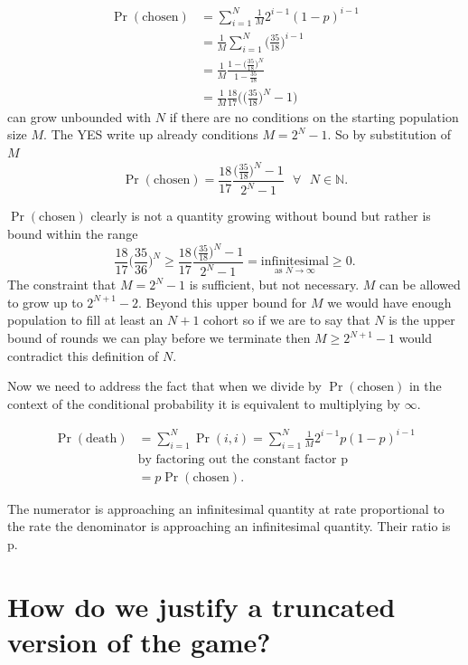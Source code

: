 \documentclass[article,twocolumn]{memoir}
\begin{document}
\begin{align*}
\Pr(\text{chosen}) &= \sum_{i=1}^{N} \tfrac{1}{M} 2^{i-1}(1-p)^{i-1}\\
&= \frac{1}{M} \sum_{i=1}^{N} \bigg(\frac{35}{18}\bigg)^{i-1}\\
&= \frac{1}{M} \frac{1-\bigg(\frac{35}{18}\bigg)^{N}}{1-\frac{35}{18}}\\
&= \frac{1}{M} \frac{18}{17}\bigg(\big(\frac{35}{18}\big)^N-1\bigg)
\end{align*}
can grow unbounded with $N$ if there are no conditions on the starting population size $M$.
The YES write up already conditions $M = 2^N-1$.
So by substitution of $M$
\begin{equation}\label{chosenALT}
\Pr(\text{chosen})= \frac{18}{17}\frac{\big(\frac{35}{18}\big)^N-1}{2^N-1} \text{  }\forall\text{  }N \in \mathbb{N}.
\end{equation}
        
$\Pr(\text{chosen})$ clearly is not a quantity growing without bound but rather is bound within the range 
$$\frac{18}{17}\bigg(\frac{35}{36}\bigg)^N\geq \frac{18}{17}\frac{\big(\frac{35}{18}\big)^N-1}{2^N-1}  = \underset{\text{as }N\to\infty }{\text{infinitesimal}} \geq 0.$$
The constraint that $M = 2^N-1$ is sufficient, but not necessary. 
$M$ can be allowed to grow up to $2^{N+1}-2$.
Beyond this upper bound for $M$ we would have enough population to fill at least an $N+1$ cohort so if we are to say that $N$ is the upper bound of rounds we can play before we terminate then $M\geq 2^{N+1}-1$ would contradict this definition of $N$.

Now we need to address the fact that when we divide by $\Pr(\text{chosen})$ in the context of the conditional probability it is equivalent to multiplying by $\infty$.

\begin{align*}
\Pr(\text{death})& = \sum_{i=1}^{N} \Pr(i,i)= \sum_{i=1}^{N} \tfrac{1}{M} 2^{i-1}p(1-p)^{i-1}\\
& \text{by factoring out the constant factor p} \\
& = p\Pr(\text{chosen}).
\end{align*}

The numerator is approaching an infinitesimal quantity at rate proportional to the rate the denominator is approaching an infinitesimal quantity.
Their ratio is p.

\chapter{How do we justify a truncated version of the game?}
    
\end{document}
